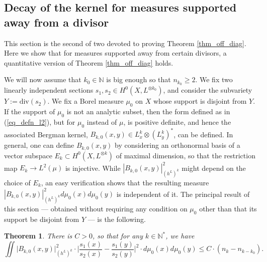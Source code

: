 \documentclass[12pt]{article}
\numberwithin{equation}{section}
\theoremstyle{theorem}
\newtheorem{thm}{Theorem}[section]
\theoremstyle{definition}
\theoremstyle{remark}
\newcommand{\nat}{\mathbb{N}}
\begin{document}
	\subsection{Decay of the kernel for measures supported away from a divisor}\label{sect_supp}
	This section is the second of two devoted to proving Theorem \ref{thm_off_diag}.
	Here we show that for measures supported away from certain divisors, a quantitative version of Theorem \ref{thm_off_diag} holds.
	\par 
	We will now assume that $k_0 \in \nat$ is big enough so that $n_{k_0} \geq 2$.
	We fix two linearly independent sections $s_1, s_2 \in H^0(X, L^{\otimes k_0})$, and consider the subvariety $Y := {\textrm{div}}(s_2)$.
	We fix a Borel measure $\mu_0$ on $X$ whose support is disjoint from $Y$.
	If the support of $\mu_0$ is not an analytic subset, then the form defined as in (\ref{eq_defn_l2}), but for $\mu_0$ instead of $\mu$, is positive definite, and hence the associated Bergman kernel, $B_{k, 0}(x, y) \in L^k_x \otimes (L^k_y)^*$, can be defined.
	In general, one can define $B_{k, 0}(x, y)$ by considering an orthonormal basis of a vector subspace $E_k \subset H^0(X, L^{\otimes k})$ of maximal dimension, so that the restriction map $E_k \to L^2(\mu)$ is injective.
	While $|B_{k, 0}(x, y)|^2_{(h^L)^k}$ might depend on the choice of $E_k$, an easy verification shows that the resulting measure $|B_{k, 0}(x, y)|^2_{(h^L)^k} d \mu_0(x) d \mu_0 (y)$ is independent of it.
	The principal result of this section — obtained without requiring any condition on $\mu_0$ other than that its support be disjoint from $Y$ — is the following.
	\begin{thm}\label{thm_qual_deloc}
		There is $C > 0$, so that for any $k \in \nat^*$, we have
		\begin{equation}\label{eq_thm_qual_deloc}
			\iint \big|B_{k, 0}(x, y)\big|^2_{(h^L)^k} \cdot \Big| \frac{s_1(x)}{s_2(x)} - \frac{s_1(y)}{s_2(y)} \Big|^2 \cdot d \mu_0(x) d \mu_0 (y)
			\leq 
			C \cdot (n_k - n_{k - k_0}).
		\end{equation}
	\end{thm}
\end{document}
